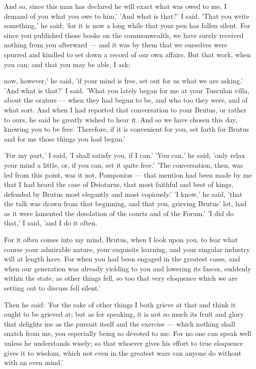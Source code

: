  And so, since this man has declared he will exact what was owed to me, I demand of you what you owe to him.' 'And what is that?' I said. 'That you write something,' he said; 'for it is now a long while that your pen has fallen silent. For since you published those books on the commonwealth, we have surely received nothing from you afterward — and it was by them that we ourselves were spurred and kindled to set down a record of our own affairs. But that work, when you can; and that you may be able, I ask;

 now, however,' he said, 'if your mind is free, set out for us what we are asking.' 'And what is that?' I said. 'What you lately began for me at your Tusculan villa, about the orators — when they had begun to be, and who too they were, and of what sort. And when I had reported that conversation to your Brutus, or rather to ours, he said he greatly wished to hear it. And so we have chosen this day, knowing you to be free. Therefore, if it is convenient for you, set forth for Brutus and for me those things you had begun.'

 'For my part,' I said, 'I shall satisfy you, if I can.' 'You can,' he said; 'only relax your mind a little, or, if you can, set it quite free.' 'The conversation, then, was led from this point, was it not, Pomponius — that mention had been made by me that I had heard the case of Deiotarus, that most faithful and best of kings, defended by Brutus most elegantly and most copiously.' 'I know,' he said, 'that the talk was drawn from that beginning, and that you, grieving Brutus' lot, had as it were lamented the desolation of the courts and of the Forum.' 'I did do that,' I said, 'and I do it often.

 For it often comes into my mind, Brutus, when I look upon you, to fear what course your admirable nature, your exquisite learning, and your singular industry will at length have. For when you had been engaged in the greatest cases, and when our generation was already yielding to you and lowering its fasces, suddenly within the state, as other things fell, so too that very eloquence which we are setting out to discuss fell silent.'

 Then he said: 'For the sake of other things I both grieve at that and think it ought to be grieved at; but as for speaking, it is not so much its fruit and glory that delights me as the pursuit itself and the exercise — which nothing shall snatch from me, you especially being so devoted to me. For no one can speak well unless he understands wisely; so that whoever gives his effort to true eloquence gives it to wisdom, which not even in the greatest wars can anyone do without with an even mind.'

